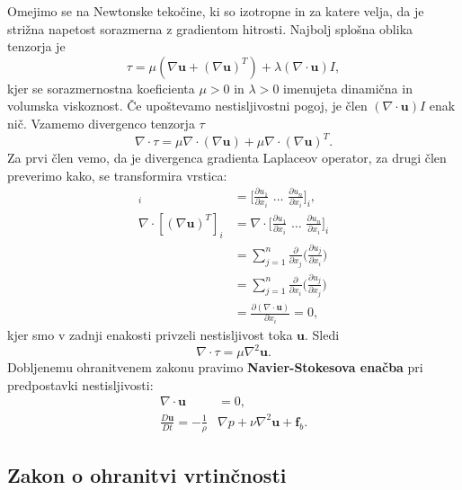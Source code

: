 \documentclass[mat2, tisk]{fmfdelo}
\newcommand{\bd}{\textbf}
\begin{document}
Omejimo se na Newtonske tekočine, ki so izotropne in za katere 
velja, da je strižna napetost sorazmerna z gradientom hitrosti.
Najbolj splošna oblika tenzorja je
\begin{equation}
\label{tenzor_tekocine}
\tau = \mu (\nabla \bd{u} + (\nabla \bd{u})^T) + \lambda (\nabla \cdot \bd{u}) I,
\end{equation}
kjer se sorazmernostna koeficienta $\mu > 0$ in $\lambda > 0$ imenujeta dinamična in volumska viskoznost. Če upoštevamo nestisljivostni pogoj, 
je člen $(\nabla \cdot \bd{u}) I$ enak nič. Vzamemo divergenco tenzorja $\tau$
$$
\nabla \cdot \tau = \mu \nabla \cdot (\nabla\bd{u}) + \mu\nabla \cdot (\nabla \bd{u})^T.
$$
Za prvi člen vemo, da je divergenca gradienta Laplaceov operator, za drugi člen preverimo kako, se transformira vrstica:
\begin{align*}
[(\nabla \bd{u})^T]_i &= \Big[\frac{\partial u_1}{\partial x_i}\,\, \dots \,\, \frac{\partial u_n}{\partial x_i}\Big]_i, \\
\nabla \cdot [(\nabla \bd{u})^T]_i &= \nabla \cdot \Big[\frac{\partial u_1}{\partial x_i}\,\, \dots \,\, \frac{\partial u_n}{\partial x_i}\Big]_i\\
&= \sum_{j=1}^n \frac{\partial}{\partial x_j} \Big(\frac{\partial u_j}{\partial x_i}\Big) \\
&= \sum_{j=1}^n \frac{\partial}{\partial x_i} \Big(\frac{\partial u_j}{\partial x_j}\Big)\\
&= \frac{\partial (\nabla \cdot \bd{u})}{\partial x_i} = 0,
\end{align*}
kjer smo v zadnji enakosti privzeli nestisljivost toka $\bd{u}$. 
Sledi
$$
\nabla \cdot \tau = \mu \nabla^2 \bd{u}.
$$
Dobljenemu ohranitvenem zakonu pravimo \bd{Navier-Stokesova enačba} pri predpostavki nestisljivosti:
\begin{align}
\label{navier-stokes}
\nabla \cdot \bd{u} &= 0,\nonumber\\[2mm]
\frac{D \bd{u}}{D t} = -\frac{1}{\rho} &\nabla p + \nu \nabla^2 \bd{u} + \bd{f}_b.
\end{align}


\subsection{Zakon o ohranitvi vrtinčnosti}
\end{document}

